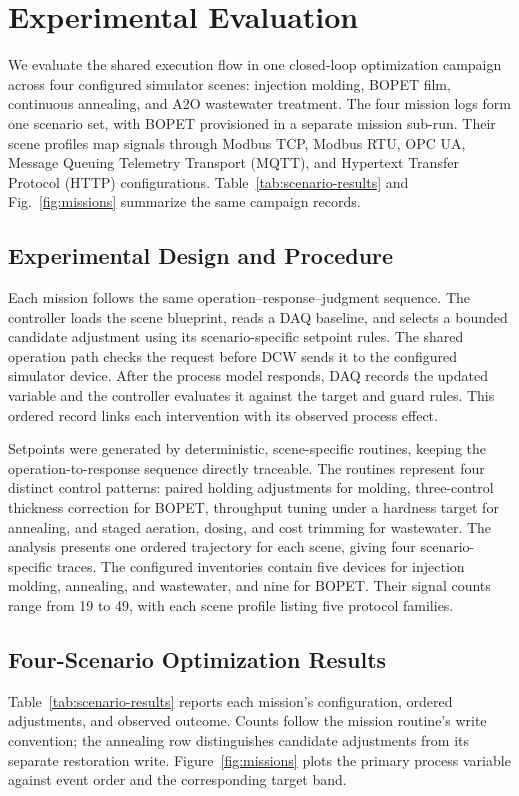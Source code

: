 \section{Experimental Evaluation}
\label{sec:eval}
We evaluate the shared execution flow in one closed-loop optimization campaign
across four configured simulator scenes: injection molding, BOPET film,
continuous annealing, and A2O wastewater treatment. The four mission logs form
one scenario set, with BOPET provisioned in a separate mission sub-run. Their
scene profiles map signals through Modbus TCP, Modbus RTU, OPC UA,
Message Queuing Telemetry Transport (MQTT), and Hypertext Transfer Protocol
(HTTP) configurations. Table~\ref{tab:scenario-results} and
Fig.~\ref{fig:missions} summarize the same campaign records.

\subsection{Experimental Design and Procedure}
\label{sec:eval-protocol}
Each mission follows the same operation--response--judgment sequence. The
controller loads the scene blueprint, reads a DAQ baseline, and selects a
bounded candidate adjustment using its scenario-specific setpoint rules. The
shared operation path checks the request before DCW sends it to the configured
simulator device. After the process model responds, DAQ records the updated
variable and the controller evaluates it against the target and guard rules.
This ordered record links each intervention with its observed process effect.

Setpoints were generated by deterministic, scene-specific routines, keeping
the operation-to-response sequence directly traceable. The routines represent
four distinct control patterns: paired holding adjustments for molding,
three-control thickness correction for BOPET, throughput tuning under a
hardness target for annealing, and staged aeration, dosing, and cost trimming
for wastewater. The analysis presents one ordered trajectory for each scene,
giving four scenario-specific traces. The configured inventories contain five devices for injection
molding, annealing, and wastewater, and nine for BOPET. Their signal counts
range from 19 to 49, with each scene profile listing five protocol families.

\subsection{Four-Scenario Optimization Results}
\label{sec:scenario-results}
Table~\ref{tab:scenario-results} reports each mission's configuration,
ordered adjustments, and observed outcome. Counts follow the mission routine's
write convention; the annealing row distinguishes candidate adjustments from
its separate restoration write. Figure~\ref{fig:missions} plots the primary
process variable against event order and the corresponding target band.

